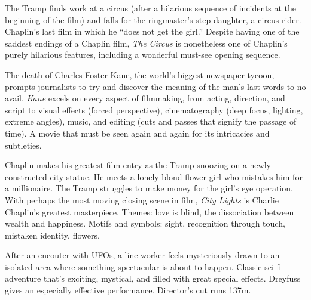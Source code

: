    The Tramp finds work at a circus (after a hilarious sequence of incidents at the beginning of the film) and falls for the ringmaster's step-daughter, a circus rider. Chaplin's last film in which he ``does not get the girl.'' Despite having one of the saddest endings of a Chaplin film, \textit{The Circus} is nonetheless one of Chaplin's purely hilarious features, including a wonderful must-see opening sequence. \author{AW} 

   The death of Charles Foster Kane, the world's biggest newspaper tycoon, prompts journalists to try and discover the meaning of the man's last words to no avail. \textit{Kane} excels on every aspect of filmmaking, from acting, direction, and script to visual effects (forced perspective), cinematography (deep focus, lighting, extreme angles), music, and editing (cuts and passes that signify the passage of time). A movie that must be seen again and again for its intricacies and subtleties. \author{AW} 

   Chaplin makes his greatest film entry as the Tramp snoozing on a newly-constructed city statue. He meets a lonely blond flower girl who mistakes him for a millionaire. The Tramp struggles to make money for the girl's eye operation. With perhaps the most moving closing scene in film, \textit{City Lights} is Charlie Chaplin's greatest masterpiece. Themes: love is blind, the dissociation between wealth and happiness. Motifs and symbols: sight, recognition through touch, mistaken identity, flowers. \author{AW}

   After an encouter with UFOs, a line worker feels mysteriously drawn to an isolated area where something spectacular is about to happen. Classic sci-fi adventure that's exciting, mystical, and filled with great special effects. Dreyfuss gives an especially effective performance. Director's cut runs 137m. \author{DW} 

